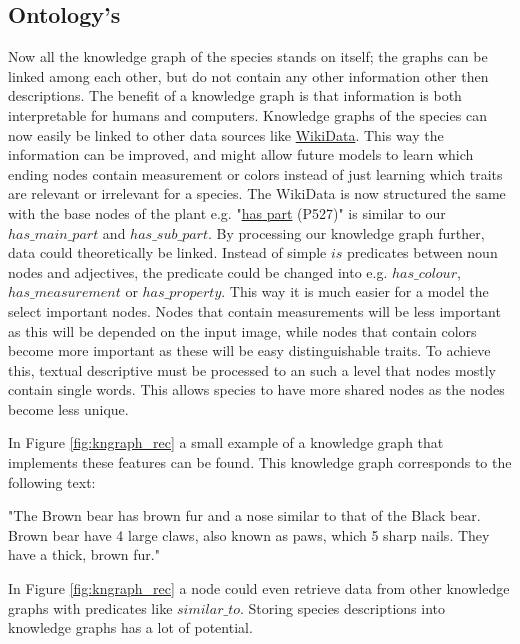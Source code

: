 \documentclass[a4paper, 12pt, oneside]{book} %
\begin{document}
\subsection{Ontology's}
Now all the knowledge graph of the species stands on itself; the graphs can be linked among each other, but do not contain any other information other then descriptions.
The benefit of a knowledge graph is that information is both interpretable for humans and computers.
Knowledge graphs of the species can now easily be linked to other data sources like \href{https://www.wikidata.org/wiki/Wikidata:Main_Page}{WikiData}.
This way the information can be improved, and might allow future models to learn which ending nodes contain measurement or colors instead of just learning which traits are relevant or irrelevant for a species.
The WikiData is now structured the same with the base nodes of the plant e.g. "\href{https://www.wikidata.org/wiki/Property:P527}{has part} (P527)"  is similar to our $has\_main\_part$ and $has\_sub\_part$.
By processing our knowledge graph further, data could theoretically be linked.
Instead of simple $is$ predicates between noun nodes and adjectives, the predicate could be changed into e.g. $has\_colour$, $has\_measurement$ or $has\_property$.
This way it is much easier for a model the select important nodes.
Nodes that contain measurements will be less important as this will be depended on the input image, while nodes that contain colors become more important as these will be easy distinguishable traits.
To achieve this, textual descriptive must be processed to an such a level that nodes mostly contain single words.
This allows species to have more shared nodes as the nodes become less unique.

In Figure \ref{fig:kngraph_rec} a small example of a knowledge graph that implements these features can be found.
This knowledge graph corresponds to the following text:
\newline

\noindent
"The Brown bear has brown fur and a nose similar to that of the Black bear. Brown bear have 4 large claws, also known as paws, which 5 sharp nails. They have a thick, brown fur."
\newline

\noindent
In Figure \ref{fig:kngraph_rec} a node could even retrieve data from other knowledge graphs with predicates like $similar\_to$.
Storing species descriptions into knowledge graphs has a lot of potential.
\end{document}
